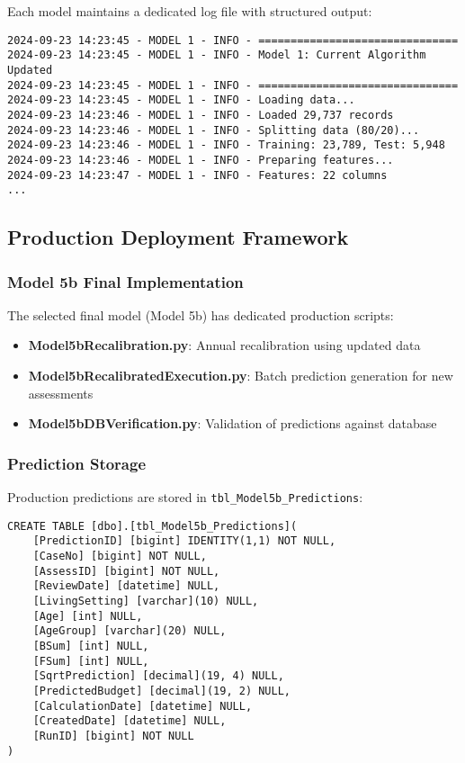 Each model maintains a dedicated log file with structured output:

\begin{verbatim}
2024-09-23 14:23:45 - MODEL 1 - INFO - ===============================
2024-09-23 14:23:45 - MODEL 1 - INFO - Model 1: Current Algorithm Updated
2024-09-23 14:23:45 - MODEL 1 - INFO - ===============================
2024-09-23 14:23:45 - MODEL 1 - INFO - Loading data...
2024-09-23 14:23:46 - MODEL 1 - INFO - Loaded 29,737 records
2024-09-23 14:23:46 - MODEL 1 - INFO - Splitting data (80/20)...
2024-09-23 14:23:46 - MODEL 1 - INFO - Training: 23,789, Test: 5,948
2024-09-23 14:23:46 - MODEL 1 - INFO - Preparing features...
2024-09-23 14:23:47 - MODEL 1 - INFO - Features: 22 columns
...
\end{verbatim}

\subsection{Production Deployment Framework}

\subsubsection{Model 5b Final Implementation}

The selected final model (Model 5b) has dedicated production scripts:

\begin{itemize}
    \item \textbf{Model5bRecalibration.py}: Annual recalibration using updated data
    \item \textbf{Model5bRecalibratedExecution.py}: Batch prediction generation for new assessments
    \item \textbf{Model5bDBVerification.py}: Validation of predictions against database
\end{itemize}

\subsubsection{Prediction Storage}

Production predictions are stored in \texttt{tbl\_Model5b\_Predictions}:

\begin{verbatim}
CREATE TABLE [dbo].[tbl_Model5b_Predictions](
    [PredictionID] [bigint] IDENTITY(1,1) NOT NULL,
    [CaseNo] [bigint] NOT NULL,
    [AssessID] [bigint] NOT NULL,
    [ReviewDate] [datetime] NULL,
    [LivingSetting] [varchar](10) NULL,
    [Age] [int] NULL,
    [AgeGroup] [varchar](20) NULL,
    [BSum] [int] NULL,
    [FSum] [int] NULL,
    [SqrtPrediction] [decimal](19, 4) NULL,
    [PredictedBudget] [decimal](19, 2) NULL,
    [CalculationDate] [datetime] NULL,
    [CreatedDate] [datetime] NULL,
    [RunID] [bigint] NOT NULL
)
\end{verbatim}

